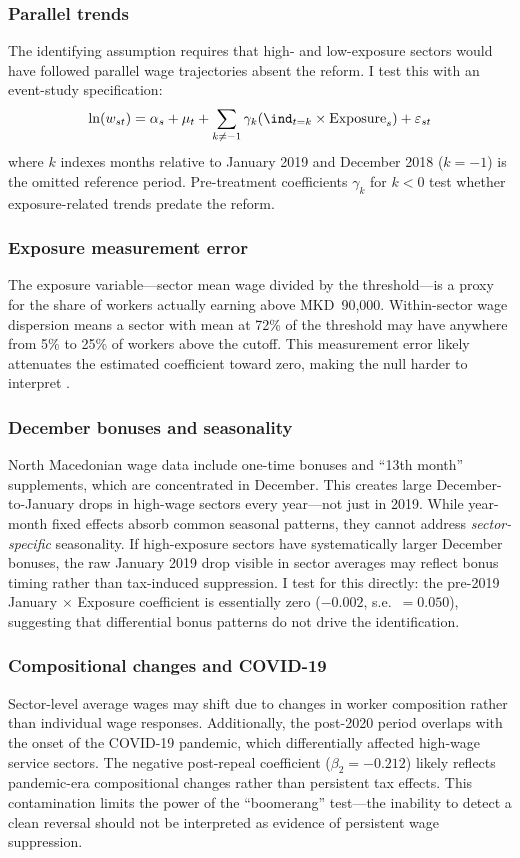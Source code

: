 \documentclass[12pt]{article}
\begin{document}
\subsubsection*{Parallel trends} The identifying assumption requires that high- and low-exposure sectors would have followed parallel wage trajectories absent the reform. I test this with an event-study specification:
\begin{equation}
\ln(w_{st}) = \alpha_s + \mu_t + \sum_{k \neq -1} \gamma_k (\ind_{t=k} \times \text{Exposure}_s) + \varepsilon_{st}
\end{equation}
where $k$ indexes months relative to January 2019 and December 2018 ($k = -1$) is the omitted reference period. Pre-treatment coefficients $\gamma_k$ for $k < 0$ test whether exposure-related trends predate the reform.

\subsubsection*{Exposure measurement error} The exposure variable---sector mean wage divided by the threshold---is a proxy for the share of workers actually earning above MKD~90,000. Within-sector wage dispersion means a sector with mean at 72\% of the threshold may have anywhere from 5\% to 25\% of workers above the cutoff. This measurement error likely attenuates the estimated coefficient toward zero, making the null harder to interpret \citep{feldstein1999tax}.

\subsubsection*{December bonuses and seasonality} North Macedonian wage data include one-time bonuses and ``13th month'' supplements, which are concentrated in December. This creates large December-to-January drops in high-wage sectors every year---not just in 2019. While year-month fixed effects absorb common seasonal patterns, they cannot address \textit{sector-specific} seasonality. If high-exposure sectors have systematically larger December bonuses, the raw January 2019 drop visible in sector averages may reflect bonus timing rather than tax-induced suppression. I test for this directly: the pre-2019 January $\times$ Exposure coefficient is essentially zero ($-0.002$, s.e.~$= 0.050$), suggesting that differential bonus patterns do not drive the identification.

\subsubsection*{Compositional changes and COVID-19} Sector-level average wages may shift due to changes in worker composition rather than individual wage responses. Additionally, the post-2020 period overlaps with the onset of the COVID-19 pandemic, which differentially affected high-wage service sectors. The negative post-repeal coefficient ($\beta_2 = -0.212$) likely reflects pandemic-era compositional changes rather than persistent tax effects. This contamination limits the power of the ``boomerang'' test---the inability to detect a clean reversal should not be interpreted as evidence of persistent wage suppression.
\end{document}
